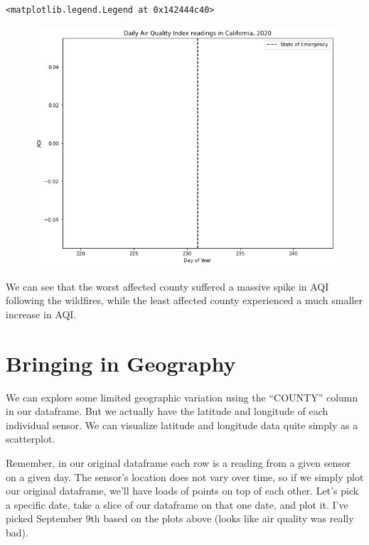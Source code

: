\documentclass[
  letterpaper,
  DIV=11,
  numbers=noendperiod]{scrreprt}
\begin{document}
\begin{verbatim}
<matplotlib.legend.Legend at 0x142444c40>
\end{verbatim}

\begin{figure}[H]

{\centering \includegraphics{notebooks/W03. Spatial Data_files/figure-pdf/cell-15-output-2.png}

}

\end{figure}

We can see that the worst affected county suffered a massive spike in
AQI following the wildfires, while the least affected county experienced
a much smaller increase in AQI.

\hypertarget{bringing-in-geography}{%
\section{Bringing in Geography}\label{bringing-in-geography}}

We can explore some limited geographic variation using the ``COUNTY''
column in our dataframe. But we actually have the latitude and longitude
of each individual sensor. We can visualize latitude and longitude data
quite simply as a scatterplot.

Remember, in our original dataframe each row is a reading from a given
sensor on a given day. The sensor's location does not vary over time, so
if we simply plot our original dataframe, we'll have loads of points on
top of each other. Let's pick a specific date, take a slice of our
dataframe on that one date, and plot it. I've picked September 9th based
on the plots above (looks like air quality was really bad).
\end{document}
